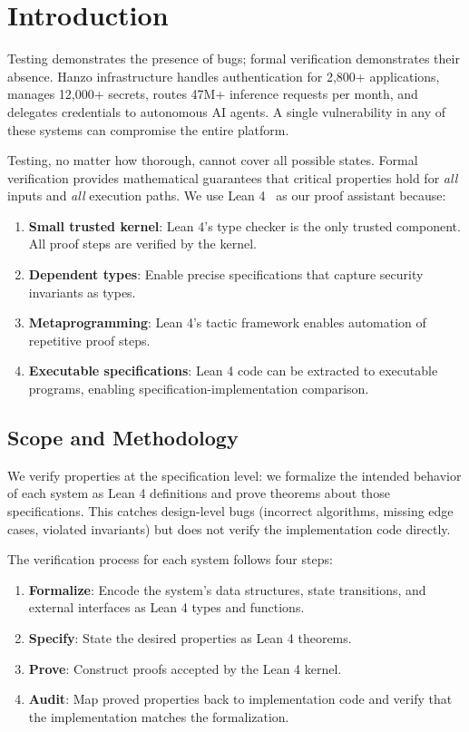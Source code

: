 \section{Introduction}

\label{sec:intro}

Testing demonstrates the presence of bugs; formal verification demonstrates
their absence. Hanzo infrastructure handles authentication for 2,800+
applications, manages 12,000+ secrets, routes 47M+ inference requests per
month, and delegates credentials to autonomous AI agents. A single
vulnerability in any of these systems can compromise the entire platform.

Testing, no matter how thorough, cannot cover all possible states. Formal
verification provides mathematical guarantees that critical properties hold
for \emph{all} inputs and \emph{all} execution paths. We use Lean
4~\cite{lean4} as our proof assistant because:
\begin{enumerate}[leftmargin=1.4em]
    \item \textbf{Small trusted kernel}: Lean 4's type checker is the only
    trusted component. All proof steps are verified by the kernel.
    \item \textbf{Dependent types}: Enable precise specifications that capture
    security invariants as types.
    \item \textbf{Metaprogramming}: Lean 4's tactic framework enables
    automation of repetitive proof steps.
    \item \textbf{Executable specifications}: Lean 4 code can be extracted to
    executable programs, enabling specification-implementation comparison.
\end{enumerate}

\subsection{Scope and Methodology}

We verify properties at the specification level: we formalize the intended
behavior of each system as Lean 4 definitions and prove theorems about those
specifications. This catches design-level bugs (incorrect algorithms, missing
edge cases, violated invariants) but does not verify the implementation code
directly.

The verification process for each system follows four steps:
\begin{enumerate}[leftmargin=1.4em]
    \item \textbf{Formalize}: Encode the system's data structures, state
    transitions, and external interfaces as Lean 4 types and functions.
    \item \textbf{Specify}: State the desired properties as Lean 4 theorems.
    \item \textbf{Prove}: Construct proofs accepted by the Lean 4 kernel.
    \item \textbf{Audit}: Map proved properties back to implementation code
    and verify that the implementation matches the formalization.
\end{enumerate}

